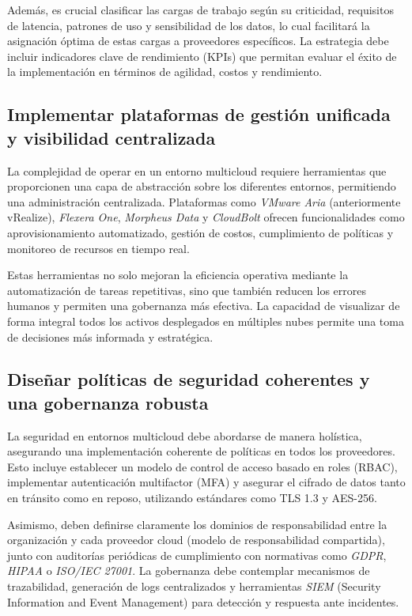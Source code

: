 {            Además, es crucial clasificar las cargas de trabajo según su criticidad, requisitos de latencia, patrones de uso y sensibilidad de los datos, lo cual facilitará la asignación óptima de estas cargas a proveedores específicos. La estrategia debe incluir indicadores clave de rendimiento (KPIs) que permitan evaluar el éxito de la implementación en términos de agilidad, costos y rendimiento.
            
        \subsection{Implementar plataformas de gestión unificada y visibilidad centralizada}
            La complejidad de operar en un entorno multicloud requiere herramientas que proporcionen una capa de abstracción sobre los diferentes entornos, permitiendo una administración centralizada. Plataformas como \textit{VMware Aria} (anteriormente vRealize), \textit{Flexera One}, \textit{Morpheus Data} y \textit{CloudBolt} ofrecen funcionalidades como aprovisionamiento automatizado, gestión de costos, cumplimiento de políticas y monitoreo de recursos en tiempo real.
            
            Estas herramientas no solo mejoran la eficiencia operativa mediante la automatización de tareas repetitivas, sino que también reducen los errores humanos y permiten una gobernanza más efectiva. La capacidad de visualizar de forma integral todos los activos desplegados en múltiples nubes permite una toma de decisiones más informada y estratégica.
            
        \subsection{Diseñar políticas de seguridad coherentes y una gobernanza robusta}
            La seguridad en entornos multicloud debe abordarse de manera holística, asegurando una implementación coherente de políticas en todos los proveedores. Esto incluye establecer un modelo de control de acceso basado en roles (RBAC), implementar autenticación multifactor (MFA) y asegurar el cifrado de datos tanto en tránsito como en reposo, utilizando estándares como TLS 1.3 y AES-256.
            
            Asimismo, deben definirse claramente los dominios de responsabilidad entre la organización y cada proveedor cloud (modelo de responsabilidad compartida), junto con auditorías periódicas de cumplimiento con normativas como \textit{GDPR}, \textit{HIPAA} o \textit{ISO/IEC 27001}. La gobernanza debe contemplar mecanismos de trazabilidad, generación de logs centralizados y herramientas \textit{SIEM} (Security Information and Event Management) para detección y respuesta ante incidentes.
            
}

